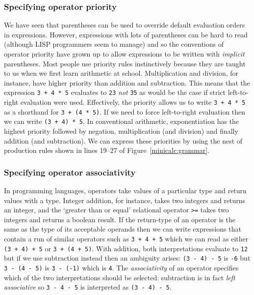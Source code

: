 {\subsubsection{Specifying operator priority}
We have seen that parentheses can be used to override default evaluation orders
in expressions. However, expressions
with lots of parentheses can be hard to read (although LISP programmers
seem to manage) and so the conventions of operator priority have grown up 
to allow expressions to be written  with {\em implicit} parentheses.
Most people use priority rules instinctively because they are taught to us
when we first learn arithmetic at school.  Multiplication and division,
for instance, have higher priority than addition and subtraction. This
means that the expression \verb|3 + 4 * 5| evaluates to {\tt 23} {\em
not} {\tt 35} as would be the case if strict left-to-right evaluation
were used. Effectively, the priority allows us to write \verb|3 + 4 * 5|
as a shorthand for \verb|3 + (4 * 5)|. If we need to force left-to-right
evaluation then we can write \verb|(3 + 4) * 5|. In conventional 
arithmetic, exponentiation has the highest priority followed by
negation, multiplication (and division) and finally addition (and
subtraction). We can express these priorities by using the nest of
production rules shown in lines 
19--27 of Figure~\ref{minicalc:grammar}.

\subsubsection{Specifying operator associativity}

In programming languages, operators take values of a particular type and
return values with a type. Integer addition, for instance, takes two
integers and returns an integer, and the `greater than or equal'
relational operator \verb+>=+ takes two integers and returns a boolean
result. If the return-type of an operator is the same as the type of its
acceptable operands then we can write expressions that contain a run of
similar operators such as \verb|3 + 4 + 5| which we can read as either
\verb|(3 + 4) + 5| or \verb|3 + (4 + 5)|. With addition, both
interpretations evaluate to \verb+12+ but if we use subtraction instead
then an ambiguity arises: \verb|(3 - 4) - 5| is \verb+-6+ but \verb|3 - (4 - 5)| 
is \verb|3 - (-1)| which is \verb+4+. The {\em associativity}
of an operator specifies which of the two interpretations should be
selected: subtraction is in fact {\em left associative} so \verb|3 - 4 - 5| 
is interpreted as \verb|(3 - 4) - 5|. 

}
